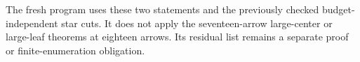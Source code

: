 \begin{remark*}
The fresh program 
uses these two statements and the previously checked
budget-independent star cuts. It does not apply the
seventeen-arrow large-center or large-leaf theorems at
eighteen arrows. Its residual list remains a separate
proof or finite-enumeration obligation.
\end{remark*}
